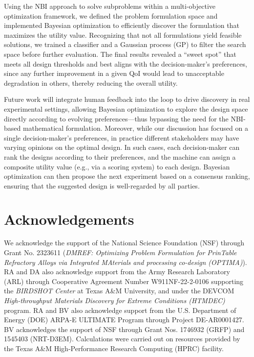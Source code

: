 \documentclass[final,5p,times,twocolumn]{elsarticle}
\begin{document}
Using the NBI approach to solve subproblems within a multi-objective optimization framework, we defined the problem formulation space and implemented Bayesian optimization to efficiently discover the formulation that maximizes the utility value. Recognizing that not all formulations yield feasible solutions, we trained a classifier and a Gaussian process (GP) to filter the search space before further evaluation. The final results revealed a “sweet spot” that meets all design thresholds and best aligns with the decision-maker’s preferences, since any further improvement in a given QoI would lead to unacceptable degradation in others, thereby reducing the overall utility.

Future work will integrate human feedback into the loop to drive discovery in real experimental settings, allowing Bayesian optimization to explore the design space directly according to evolving preferences—thus bypassing the need for the NBI-based mathematical formulation. Moreover, while our discussion has focused on a single decision-maker’s preferences, in practice different stakeholders may have varying opinions on the optimal design. In such cases, each decision-maker can rank the designs according to their preferences, and the machine can assign a composite utility value (e.g., via a scoring system) to each design. Bayesian optimization can then propose the next experiment based on a consensus ranking, ensuring that the suggested design is well-regarded by all parties.

\section*{Acknowledgements}
We acknowledge the support of the National Science Foundation (NSF) through Grant No. 2323611 (\emph{DMREF: Optimizing Problem Formulation for PrinTable Refractory Alloys via Integrated MAterials and processing co-design (OPTIMA)}). RA and DA also acknowledge support from the Army Research Laboratory (ARL) through Cooperative Agreement Number W911NF-22-2-0106 supporting the \emph{BIRDSHOT Center} at Texas A\&M University, and under the DEVCOM \emph{High-throughput Materials Discovery for Extreme Conditions (HTMDEC)} program. RA and BV also acknowledge support from the U.S. Department of Energy (DOE) ARPA-E ULTIMATE Program through Project DE-AR0001427. BV acknowledges the support of NSF through Grant Nos. 1746932 (GRFP) and 1545403 (NRT-D3EM). Calculations were carried out on resources provided by the Texas A\&M High-Performance Research Computing (HPRC) facility.



\end{document}
